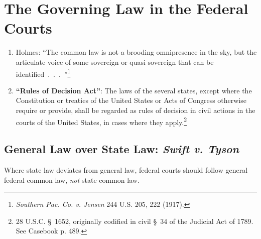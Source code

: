 \section{The Governing Law in the Federal Courts}

\begin{enumerate}
    \item Holmes: ``The common law is not a brooding omnipresence in the sky, 
    but the articulate voice of some sovereign or quasi sovereign that can be 
    identified~.~.~.~''\footnote{\emph{Southern Pac. Co. v. Jensen} 244 U.S. 205, 
    222 (1917).}
    \item \textbf{``Rules of Decision Act''}: The laws of the several states, 
    except where the Constitution or treaties of the United States or Acts of 
    Congress otherwise require or provide, shall be regarded as rules of 
    decision in civil actions in the courts of the United States, in cases 
    where they apply.\footnote{28 U.S.C. \S\ 1652, originally codified in 
    civil \S\ 34 of the Judicial Act of 1789. See Casebook p. 489.}
\end{enumerate}

\subsection{General Law over State Law: \emph{Swift v. Tyson}}

Where state law deviates from general law, federal courts should follow 
general federal common law, \emph{not} state common law.

